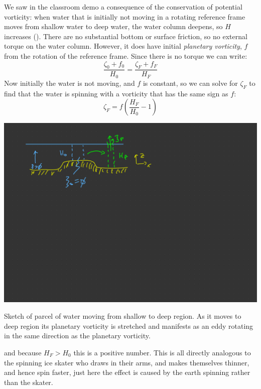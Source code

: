 We saw in the classroom demo a consequence of the conservation of potential vorticity:  when water that is initially not moving in a rotating reference frame moves from shallow water to deep water, the water column deepens, so $H$ increases ().  There are no substantial bottom or surface friction, so no external torque on the water column.  However, it does have initial \emph{planetary vorticity}, $f$ from the rotation of the reference frame.  Since there is no torque we can write:
\begin{equation}
    \frac{\zeta_0 + f_0}{H_0} = \frac{\zeta_F + f_F}{H_F} 
\end{equation}
Now initially the water is not moving, and $f$ is constant, so we can solve for $\zeta_F$ to find that the water is spinning with a vorticity that has the same sign as $f$:
\begin{equation}
    \zeta_F = f \left(\frac{H_F}{H_0} - 1 \right)
\end{equation}
\begin{marginfigure}
    \includegraphics{figs/Sverdrup/PVChangeEddy}
    \caption{Sketch of parcel of water moving from shallow to deep region.  As it moves to deep region its planetary vorticity is stretched and manifests as an eddy rotating in the same direction as the planetary vorticity.}
    \label{fig:PVChangeEddy}
\end{marginfigure}
and because $H_F>H_0$ this is a positive number.  This is all directly analogous to the spinning ice skater who draws in their arms, and makes themselves thinner, and hence spin faster, just here the effect is caused by the earth spinning rather than the skater.  

